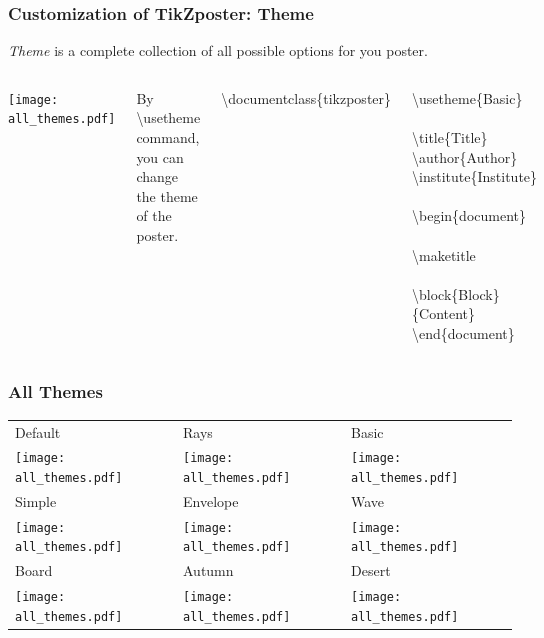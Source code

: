 \documentclass[9pt]{beamer}
\newcommand{\bs}{\textbackslash}   %
\begin{document}
\begin{frame}
  \frametitle{Customization of TikZposter: Theme}
  
  \emph{Theme} is a complete collection of all possible options for you poster.

  \medskip
  \begin{columns}[c]
    \texttt{[image: all\_themes.pdf]}

    By \bs usetheme command, you can change the theme of the poster.
    
    \medskip
    \hspace{0.2cm}
    \begin{minipage}{.6\textwidth}\small
      \bs documentclass\{tikzposter\}
    
      \bs usetheme\{Basic\}\\
      \\
      \bs title\{Title\}\\
      \bs author\{Author\}\\
      \bs institute\{Institute\}\\
      \\
      \bs begin\{document\}\\
      \\
      \bs maketitle\\
      \\
      \bs block\{Block\}\{Content\}\\
      \bs end\{document\}
    \end{minipage}

  \end{columns}
\end{frame}

\begin{frame}
  \frametitle{All Themes}
  
  \small\vspace{-0.05cm}
  \begin{tabular}[t]{@{}p{3.5cm}@{~~~}p{3.5cm}@{~~~}p{3.5cm}}
    Default & Rays & Basic\\[-0.03cm]
    \texttt{[image: all\_themes.pdf]} &
    \texttt{[image: all\_themes.pdf]} &
    \texttt{[image: all\_themes.pdf]} \\ [0.03cm]
    Simple & Envelope & Wave\\[-0.03cm]
    \texttt{[image: all\_themes.pdf]} &
    \texttt{[image: all\_themes.pdf]} &
    \texttt{[image: all\_themes.pdf]} \\ [0.03cm]
    Board & Autumn & Desert\\[-0.03cm]
    \texttt{[image: all\_themes.pdf]} &
    \texttt{[image: all\_themes.pdf]} &
    \texttt{[image: all\_themes.pdf]} \\
 \end{tabular}
\end{frame}
\end{document}
